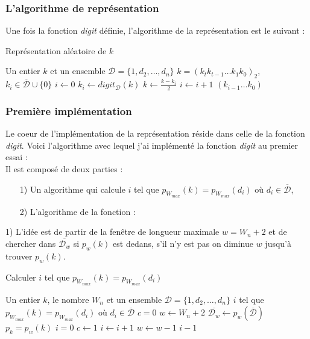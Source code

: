 \documentclass[12pt, a4paper]{memoir}
\begin{document}
\subsubsection{L'algorithme de représentation}

Une fois la fonction \emph{digit} définie, l'algorithme de la représentation est le suivant :

\begin{algorithm}
 \caption{Représentation aléatoire de $k$}
 \begin{algorithmic}
  \REQUIRE Un entier $k$ et un ensemble $\mathcal{D} = \{1,d_2,\ldots,d_n\}$
  \ENSURE $k = (k_t k_{t-1} \ldots k_1 k_0)_2$, $k_i \in  \overline{\mathcal{D}} \cup \{0\}$
  \STATE $i \leftarrow 0$
  \STATE $k_i \leftarrow digit_{\mathcal{D}}(k)$
  \STATE $k \leftarrow \frac{k-k_i}{2}$
  \STATE $i \leftarrow i+1$
  \ENDWHILE
  \RETURN $(k_{i-1} \ldots k_0)$
 \end{algorithmic}
\end{algorithm}

\subsubsection{Première implémentation}

Le coeur de l'implémentation de la représentation réside dans celle de la fonction \emph{digit}.
Voici l'algorithme avec lequel j'ai implémenté la fonction \emph{digit} au premier essai : \\
Il est composé de deux parties :
\begin{itemize}
 \item [1)] Un algorithme qui calcule $i$ tel que $p_{W_{max}}(k) = p_{W_{max}}(d_i)$ où $d_i \in \overline{\mathcal{D}}$,
 \item [2)] L'algorithme de la fonction :
\end{itemize}

1) L'idée est de partir de la fenêtre de longueur maximale $w=W_n+2$ et de chercher dans $\overline{\mathcal{D}_w}$
si $p_w(k)$ est dedans, s'il n'y est pas on diminue $w$ jusqu'à trouver $p_w(k)$.

\begin{algorithm}
 \caption{Calculer $i$ tel que $p_{W_{max}}(k) = p_{W_{max}}(d_i)$}
 \begin{algorithmic}
  \REQUIRE Un entier $k$, le nombre $W_n$ et un ensemble $\mathcal{D} = \{1,d_2,\ldots,d_n\}$
  \ENSURE $i$ tel que $p_{W_{max}}(k) = p_{W_{max}}(d_i)$ où $d_i \in \overline{\mathcal{D}}$
  \STATE $c = 0$  
  \STATE $w \leftarrow W_n+2$
  \STATE $\overline{\mathcal{D}_w} \leftarrow p_w(\overline{\mathcal{D}})$
  \STATE $p_k = p_w(k)$
  \STATE $i = 0$
  \STATE $c \leftarrow 1$
  \ENDIF
  \STATE $i \leftarrow i+1$
  \ENDWHILE
  \STATE $w \leftarrow w-1$
  \ENDWHILE
  \RETURN $i-1$
 \end{algorithmic}
\end{algorithm}
\end{document}
